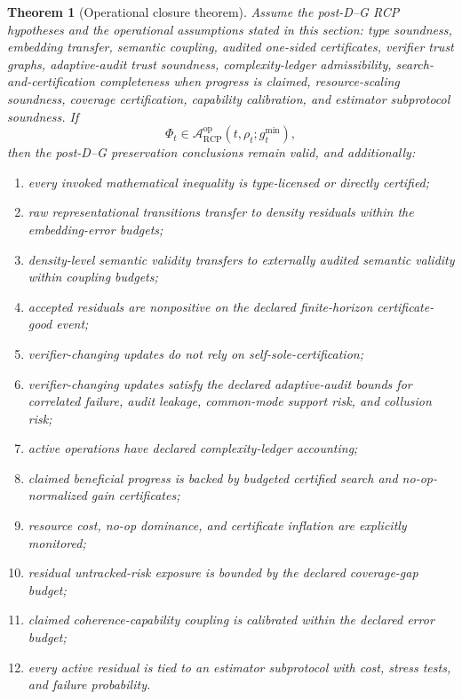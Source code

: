 \documentclass[11pt]{article}
\newtheorem{theorem}{Theorem}[section]
\newcommand{\Acal}{\mathcal{A}}
\newcommand{\1}{\mathbf{1}}
\newcommand{\RCP}{\mathrm{RCP}}
\begin{document}
\begin{theorem}[Operational closure theorem]
\label{thm:operational_closure_theorem}
Assume the post-D--G RCP hypotheses and the operational assumptions stated in this section: type soundness, embedding transfer, semantic coupling, audited one-sided certificates, verifier trust graphs, adaptive-audit trust soundness, complexity-ledger admissibility, search-and-certification completeness when progress is claimed, resource-scaling soundness, coverage certification, capability calibration, and estimator subprotocol soundness.  If
\[
\Phi_t\in\Acal_{\RCP}^{\mathrm{op}}(t,\rho_t;g_t^{\min}),
\]
then the post-D--G preservation conclusions remain valid, and additionally:
\begin{enumerate}[label=(\alph*)]
    \item every invoked mathematical inequality is type-licensed or directly certified;
    \item raw representational transitions transfer to density residuals within the embedding-error budgets;
    \item density-level semantic validity transfers to externally audited semantic validity within coupling budgets;
    \item accepted residuals are nonpositive on the declared finite-horizon certificate-good event;
    \item verifier-changing updates do not rely on self-sole-certification;
    \item verifier-changing updates satisfy the declared adaptive-audit bounds for correlated failure, audit leakage, common-mode support risk, and collusion risk;
    \item active operations have declared complexity-ledger accounting;
    \item claimed beneficial progress is backed by budgeted certified search and no-op-normalized gain certificates;
    \item resource cost, no-op dominance, and certificate inflation are explicitly monitored;
    \item residual untracked-risk exposure is bounded by the declared coverage-gap budget;
    \item claimed coherence-capability coupling is calibrated within the declared error budget;
    \item every active residual is tied to an estimator subprotocol with cost, stress tests, and failure probability.
\end{enumerate}
\end{theorem}
\end{document}
